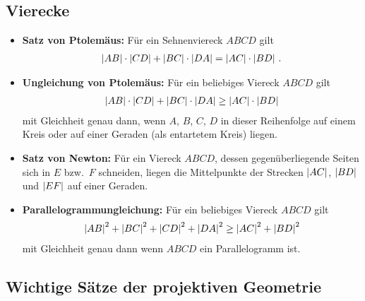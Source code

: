\documentclass[11pt,a4paper]{article}
\begin{document}
\subsection*{Vierecke}
\begin{itemize}
\item \textbf{Satz von Ptolemäus:} Für ein Sehnenviereck $ABCD$ gilt
  \begin{gather*}
    \left\vert {\mathnormal{AB}}\right\vert\cdot \left\vert {\mathnormal{CD}}\right\vert +\left\vert {\mathnormal{BC}}\right\vert\cdot \left\vert {\mathnormal{DA}}\right\vert
    =\left\vert {\mathnormal{AC}}\right\vert\cdot \left\vert {\mathnormal{BD}}\right\vert\,.
  \end{gather*}
\item \textbf{Ungleichung von Ptolemäus:} Für ein beliebiges Viereck $ABCD$
  gilt 
  \begin{gather*}
    \left\vert {\mathnormal{AB}}\right\vert\cdot \left\vert {\mathnormal{CD}}\right\vert+\left\vert {\mathnormal{BC}}\right\vert\cdot \left\vert {\mathnormal{DA}}\right\vert
    \geq\left\vert {\mathnormal{AC}}\right\vert\cdot \left\vert {\mathnormal{BD}}\right\vert
  \end{gather*}
  mit Gleichheit genau dann, wenn $A$, $B$, $C$, $D$ in dieser Reihenfolge auf
  einem Kreis oder auf einer Geraden (als entartetem Kreis) liegen.
\item \textbf{Satz von Newton:} Für ein Viereck $ABCD$, dessen
  gegenüberliegende Seiten sich in $E$ bzw.\ $F$ schneiden, liegen die
  Mittelpunkte der Strecken $\left\vert {\mathnormal{AC}}\right\vert$, $\left\vert {\mathnormal{BD}}\right\vert$ und
  $\left\vert {\mathnormal{EF}}\right\vert$ auf einer Geraden.
\item \textbf{Parallelogrammungleichung:} Für ein beliebiges Viereck $ABCD$
  gilt
  \begin{gather*}
    \left\vert {\mathnormal{AB}}\right\vert^{2}+\left\vert {\mathnormal{BC}}\right\vert^{2}+\left\vert {\mathnormal{CD}}\right\vert^{2}+\left\vert {\mathnormal{DA}}\right\vert^{2}
    \geq \left\vert {\mathnormal{AC}}\right\vert^{2}+\left\vert {\mathnormal{BD}}\right\vert^{2}
  \end{gather*}
  mit Gleichheit genau dann wenn $ABCD$ ein Parallelogramm ist.
\end{itemize}

\subsection*{Wichtige Sätze der projektiven Geometrie}
\end{document}
